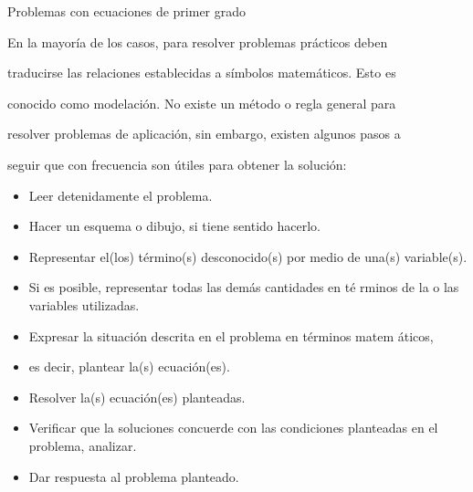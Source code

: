 \documentclass[10pt]{beamer}
\begin{document}
	
\begin{frame}{Problemas con ecuaciones de primer grado}

En la mayoría de los casos, para resolver problemas pr\'{a}cticos deben

traducirse las relaciones establecidas a símbolos matem\'{a}ticos. Esto
es

conocido como modelación. No existe un método o regla general para

resolver problemas de aplicación, sin embargo, existen algunos pasos a

seguir que con frecuencia son útiles para obtener la solución:

\begin{itemize}
	\item Leer detenidamente el problema.
	
	\item Hacer un esquema o dibujo, si tiene sentido hacerlo.
	
	\item Representar el(los) término(s) desconocido(s) por medio de una(s)
	variable(s).
	
	\item Si es posible, representar todas las dem\'{a}s cantidades en té%
	rminos de la o las variables utilizadas.
	
	\item Expresar la situación descrita en el problema en términos matem%
	\'{a}ticos,
	
	\item es decir, plantear la(s) ecuación(es).
	
	\item Resolver la(s) ecuación(es) planteadas.
	
	\item Verificar que la soluciones concuerde con las condiciones planteadas
	en el problema, analizar.
	
	\item Dar respuesta al problema planteado.
\end{itemize}

\end{frame}%
\end{document}
